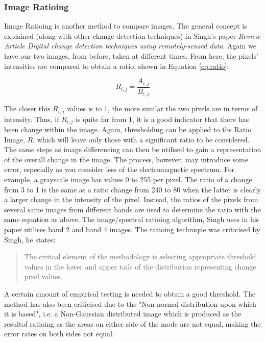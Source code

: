 \documentclass[11pt]{article}
\begin{document}
\subsubsection{Image Ratioing}
Image Ratioing is another method to compare images. The general concept
is explained (along with other change detection techniques) in Singh's
paper \textit{Review Article Digital change detection techniques 
using remotely-sensed data}\cite{Singh88}. Again we have our two images,
from before, taken at different times. From here, the pixels' intensities
are compared to obtain a ratio, shown in Equation \ref{eq:ratio}:

\begin{equation}
	R_{i,j} = \frac{A_{i,j}}{B_{i,j}}
	\label{eq:ratio}
\end{equation}

The closer this $R_{i,j}$ values is to 1, the more similar the two 
pixels are in terms of intensity. Thus, if $R_{i,j}$ is quite far from 
1, it is a good indicator that there has been change within the image.
Again, thresholding can be applied to ths Ratio Image, $R$, which will 
leave only those with a significant ratio to be considered. The same steps
as image differencing can then be utilised to gain a representation of the
overall change in the image. The process, however, may introduce some error,
especially as you consider less of the electromagnetic spectrum. For example,
a grayscale image has values 0 to 255 per pixel. The ratio of a change from
3 to 1 is the same as a ratio change from 240 to 80 when the latter is clearly
a larger change in the intensity of the pixel. Instead, the ratios of the
pixels from several same images from different bands are used to determine
the ratio with the same equation as above. The image/spectral ratioing
algorithm, Singh uses in his paper utilises band 2 and band 4 images. The 
ratioing technique was criticised by Singh, he states: \\
\begin{quote}
The critical element of the methodology is selecting appropriate threshold 
values in the lower and upper tails of the distribution representing change 
pixel values.
\end{quote}

A certain amount of empirical testing is needed to obtain a good threshold.
The method has also been criticised due to the "Non-normal distribution upon
which it is based", i.e. a Non-Gaussian distributed image which is produced as 
the resultof ratioing as the areas on either side of the mode are not equal, 
making the error rates on both sides not equal.
\end{document}
